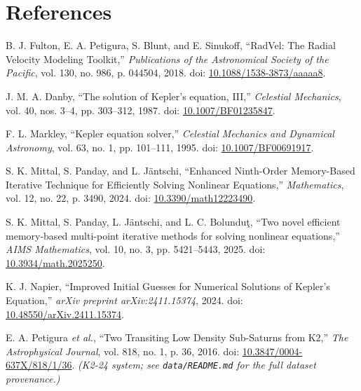 \documentclass[11pt,a4paper]{article}
\begin{document}
\section*{References}
\begingroup
\small
\begin{enumerate}[label={[\arabic*]}, leftmargin=2.2em, itemsep=0.7em]

  \item B. J. Fulton, E. A. Petigura, S. Blunt, and E. Sinukoff,
  ``RadVel: The Radial Velocity Modeling Toolkit,''
  \textit{Publications of the Astronomical Society of the Pacific},
  vol. 130, no. 986, p. 044504, 2018.
  doi: \href{https://doi.org/10.1088/1538-3873/aaaaa8}
  {10.1088/1538-3873/aaaaa8}.

  \item J. M. A. Danby,
  ``The solution of Kepler's equation, III,''
  \textit{Celestial Mechanics},
  vol. 40, nos. 3--4, pp. 303--312, 1987.
  doi: \href{https://doi.org/10.1007/BF01235847}
  {10.1007/BF01235847}.

  \item F. L. Markley,
  ``Kepler equation solver,''
  \textit{Celestial Mechanics and Dynamical Astronomy},
  vol. 63, no. 1, pp. 101--111, 1995.
  doi: \href{https://doi.org/10.1007/BF00691917}
  {10.1007/BF00691917}.

  \item S. K. Mittal, S. Panday, and L. J{\"a}ntschi,
  ``Enhanced Ninth-Order Memory-Based Iterative Technique for Efficiently
  Solving Nonlinear Equations,''
  \textit{Mathematics},
  vol. 12, no. 22, p. 3490, 2024.
  doi: \href{https://doi.org/10.3390/math12223490}
  {10.3390/math12223490}.

  \item S. K. Mittal, S. Panday, L. J{\"a}ntschi, and L. C. Bolundu{\c{t}},
  ``Two novel efficient memory-based multi-point iterative methods for
  solving nonlinear equations,''
  \textit{AIMS Mathematics},
  vol. 10, no. 3, pp. 5421--5443, 2025.
  doi: \href{https://doi.org/10.3934/math.2025250}
  {10.3934/math.2025250}.

  \item K. J. Napier,
  ``Improved Initial Guesses for Numerical Solutions of Kepler's
  Equation,''
  \textit{arXiv preprint arXiv:2411.15374}, 2024.
  doi: \href{https://doi.org/10.48550/arXiv.2411.15374}
  {10.48550/arXiv.2411.15374}.

  \item E. A. Petigura \textit{et al.},
  ``Two Transiting Low Density Sub-Saturns from K2,''
  \textit{The Astrophysical Journal}, vol. 818, no. 1, p. 36, 2016.
  doi: \href{https://doi.org/10.3847/0004-637X/818/1/36}
  {10.3847/0004-637X/818/1/36}.
  \textit{(K2-24 system; see \texttt{data/README.md} for the full dataset
  provenance.)}


\end{enumerate}
\end{document}
